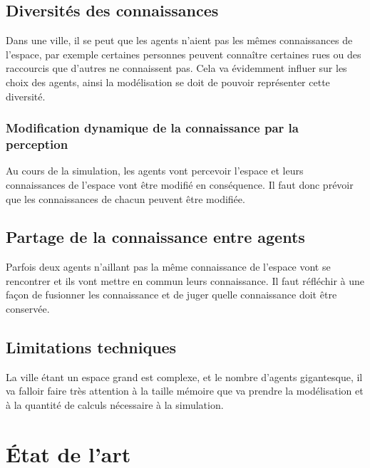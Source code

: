 \documentclass[a4paper]{article}
\begin{document}
\subsection{Diversités des connaissances}

Dans une ville, il se peut que les agents n'aient pas les mêmes connaissances
de l'espace, par exemple certaines personnes peuvent connaître certaines rues
ou des raccourcis que d'autres ne connaissent pas. Cela va évidemment influer
sur les choix des agents, ainsi la modélisation se doit de pouvoir représenter
cette diversité.

\subsubsection{Modification dynamique de la connaissance par la perception}

Au cours de la simulation, les agents vont percevoir l'espace et leurs
connaissances de l'espace vont être modifié en conséquence. Il faut donc prévoir
que les connaissances de chacun peuvent être modifiée.

\subsection{Partage de la connaissance entre agents}

Parfois deux agents n'aillant pas la même connaissance de l'espace vont se
rencontrer et ils vont mettre en commun leurs connaissance. Il faut réfléchir
à une façon de fusionner les connaissance et de juger quelle connaissance doit
être conservée.

\subsection{Limitations techniques}

La ville étant un espace grand est complexe, et le nombre d'agents gigantesque,
il va falloir faire très attention à la taille mémoire que va prendre la
modélisation et à la quantité de calculs nécessaire à la simulation.

\section{État de l'art}
\end{document}
